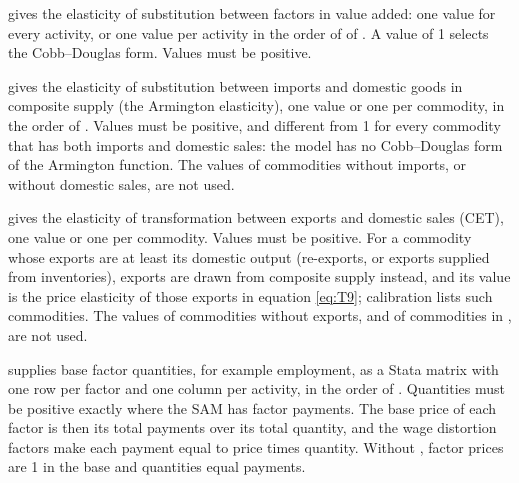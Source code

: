 \begin{optdesc}
\item[\optarg{}{sigmava}{numlist}] gives the elasticity of substitution between
factors in value added: one value for every activity, or one value per activity
in the order of  of . A value of 1 selects
the Cobb--Douglas form. Values must be positive.

\item[\optarg{}{sigmaq}{numlist}] gives the elasticity of substitution between
imports and domestic goods in composite supply (the Armington elasticity), one
value or one per commodity, in the order of . Values must be
positive, and different from 1 for every commodity that has both imports and
domestic sales: the model has no Cobb--Douglas form of the Armington function.
The values of commodities without imports, or without domestic sales, are not
used.

\item[\optarg{}{sigmat}{numlist}] gives the elasticity of transformation between
exports and domestic sales (CET), one value or one per commodity. Values must
be positive. For a commodity whose exports are at least its domestic output
(re-exports, or exports supplied from inventories), exports are drawn from
composite supply instead, and its  value is the price elasticity
of those exports in equation \eqref{eq:T9}; calibration lists such commodities. The
values of commodities without exports, and of commodities in
, are not used.

\item[\optarg{fq}{uantities}{matname}] supplies base factor quantities, for
example employment, as a Stata matrix with one row per factor and one column
per activity, in the order of . Quantities must be positive
exactly where the SAM has factor payments. The base price of each factor is
then its total payments over its total quantity, and the wage distortion
factors make each payment equal to price times quantity. Without
, factor prices are 1 in the base and quantities equal
payments.
\end{optdesc}


